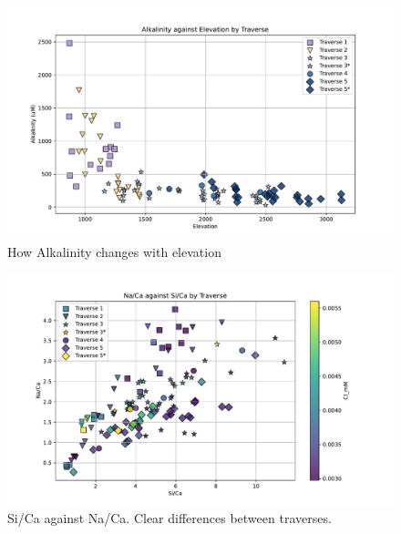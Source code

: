 \FloatBarrier

\begin{figure}[h]
    \centering
    \includegraphics[width=\textwidth]{Alkalinity_Elevation.pdf}
    \caption{How Alkalinity changes with elevation}
    \label{fig:spatial_changes_spring2}
\end{figure}

\FloatBarrier

\begin{figure}[h]
    \centering
    \includegraphics[width=\textwidth]{SiCaNaCa.pdf}
    \caption{Si/Ca against Na/Ca. Clear differences between traverses.}
    \label{fig:spatial_changes_spring3}
\end{figure}

\FloatBarrier

